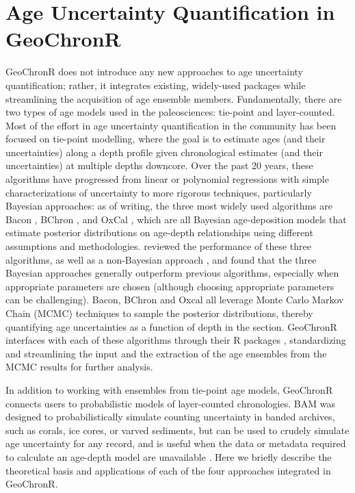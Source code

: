 \documentclass[gchron, manuscript]{copernicus}
\begin{document}
\hypertarget{sec:age-modeling}{%
\section{Age Uncertainty Quantification in GeoChronR}\label{sec:age-modeling}}

GeoChronR does not introduce any new approaches to age uncertainty quantification; rather, it integrates existing, widely-used packages while streamlining the acquisition of age ensemble members.
Fundamentally, there are two types of age models used in the paleosciences: tie-point and layer-counted.
Most of the effort in age uncertainty quantification in the community has been focused on tie-point modelling, where the goal is to estimate ages (and their uncertainties) along a depth profile given chronological estimates (and their uncertainties) at multiple depths downcore.
Over the past 20 years, these algorithms have progressed from linear or polynomial regressions with simple characterizations of uncertainty \citep{Heegaard2005, Blaauw2010CLAM} to more rigorous techniques, particularly Bayesian approaches: as of writing, the three most widely used algorithms are Bacon \citep{bacon}, BChron \citep{parnell2008flexible}, and OxCal \citep{ramsey2008deposition}, which are all Bayesian age-deposition models that estimate posterior distributions on age-depth relationships using different assumptions and methodologies.
\citet{trachsel2017} reviewed the performance of these three algorithms, as well as a non-Bayesian approach \citep{Blaauw2010CLAM}, and found that the three Bayesian approaches generally outperform previous algorithms, especially when appropriate parameters are chosen (although choosing appropriate parameters can be challenging).
Bacon, BChron and Oxcal all leverage Monte Carlo Markov Chain (MCMC) techniques to sample the posterior distributions, thereby quantifying age uncertainties as a function of depth in the section.
GeoChronR interfaces with each of these algorithms through their R packages \citetext{\citealp[\citet{baconPackage}]{parnell2008flexible}; \citealp{oxcAAR}}, standardizing and streamlining the input and the extraction of the age ensembles from the MCMC results for further analysis.

In addition to working with ensembles from tie-point age models, GeoChronR connects users to probabilistic models of layer-counted chronologies.
BAM \citep{BAM} was designed to probabilistically simulate counting uncertainty in banded archives, such as corals, ice cores, or varved sediments, but can be used to crudely simulate age uncertainty for any record, and is useful when the data or metadata required to calculate an age-depth model are unavailable \citep[e.g.][]{kaufman2020HoloceneGMST}.
Here we briefly describe the theoretical basis and applications of each of the four approaches integrated in GeoChronR.
\end{document}
